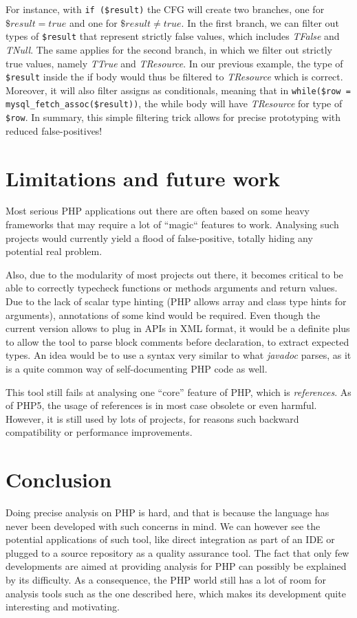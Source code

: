 \documentclass[a4paper]{article}
\begin{document}
For instance, with \verb/if ($result)/ the CFG will create two branches, one
for $\$result = true$ and one for $\$result \neq true$. In the first branch, we
can filter out types of \verb/$result/ that represent strictly false values,
which includes \emph{TFalse} and \emph{TNull}. The same applies for the second
branch, in which we filter out strictly true values, namely \emph{TTrue} and
\emph{TResource}. In our previous example, the type of \verb/$result/ inside
the if body would thus be filtered to \emph{TResource} which is correct.
Moreover, it will also filter assigns as conditionals, meaning that in 
\verb/while($row = mysql_fetch_assoc($result))/, the while body will have
\emph{TResource} for type of \verb/$row/. In summary, this simple filtering
trick allows for precise prototyping with reduced false-positives!

\section{Limitations and future work}
Most serious PHP applications out there are often based on some heavy frameworks
that may require a lot of ``magic`` features to work. Analysing such projects
would currently yield a flood of false-positive, totally hiding any potential
real problem.

Also, due to the modularity of most projects out there, it becomes critical to
be able to correctly typecheck functions or methods arguments and return values.
Due to the lack of scalar type hinting (PHP allows array and class type hints
for arguments), annotations of some kind would be required. Even though the
current version allows to plug in APIs in XML format, it would be a definite
plus to allow the tool to parse block comments before declaration, to extract
expected types. An idea would be to use a syntax very similar to what
\emph{javadoc} parses, as it is a quite common way of self-documenting PHP
code as well.

This tool still fails at analysing one ``core'' feature of PHP, which is
\emph{references}. As of PHP5, the usage of references is in most case obsolete
or even harmful. However, it is still used by lots of projects, for reasons
such backward compatibility or performance improvements.

\section{Conclusion}
Doing precise analysis on PHP is hard, and that is because the language has never
been developed with such concerns in mind. We can however see the potential
applications of such tool, like direct integration as part of an IDE or
plugged to a source repository as a quality assurance tool. The fact that only
few developments are aimed at providing analysis for PHP can possibly be
explained by its difficulty. As a consequence, the PHP world still has a lot
of room for analysis tools such as the one described here, which  makes its
development quite interesting and motivating.
\end{document}
